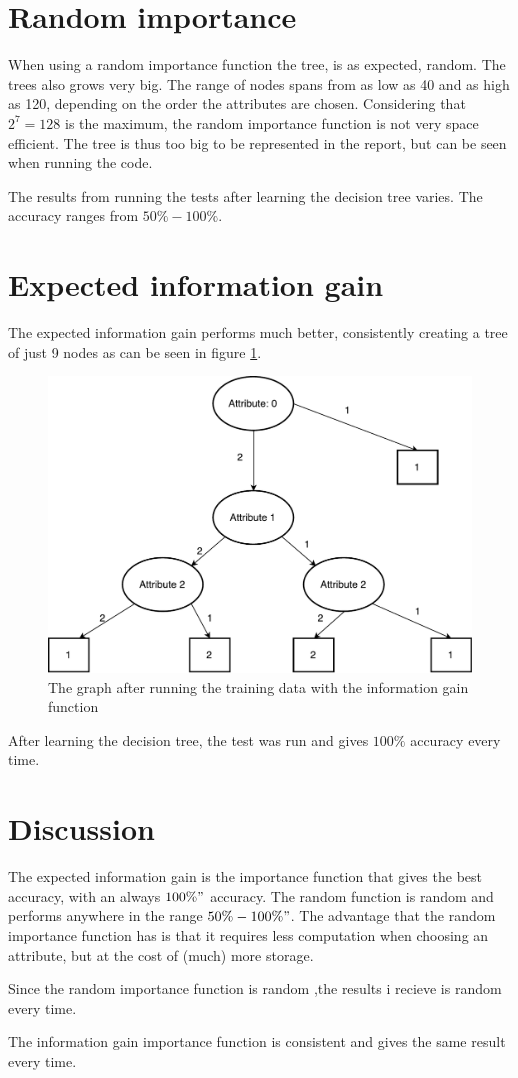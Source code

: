\documentclass[a4paper]{article}
\date{}
\begin{document}
\thispagestyle{fancy}

\section{Random importance}
    When using a random importance function the tree, is as expected, random. The trees also grows very big. The range of nodes spans from as low as 40 and as high as 120, depending on the order the attributes are chosen. Considering that $2^7 = 128$ is the maximum, the random importance function is not very space efficient. The tree is thus too big to be represented in the report, but can be seen when running the code. 

    The results from running the tests after learning the decision tree varies. The accuracy ranges from $50\%-100\%$.

\section{Expected information gain}
    The expected information gain performs much better, consistently creating a tree of just 9 nodes as can be seen in figure \ref{fig:expected}.

    \begin{figure}[ht]
        \centering
        \includegraphics[width=0.8\linewidth]{information_gain.pdf}
        \caption{The graph after running the training data with the information gain function}
        \label{fig:expected}
    \end{figure}

    After learning the decision tree, the test was run and gives $100\%$ accuracy every time.

\section{Discussion}

    The expected information gain is the importance function that gives the best accuracy, with an always $100\%"$ accuracy. The random function is random and performs anywhere in the range $50\%-100\%"$. The advantage that the random importance function has is that it requires less computation when choosing an attribute, but at the cost of (much) more storage.

    Since the random importance function is random ,the results i recieve is random every time.

    The information gain importance function is consistent and gives the same result every time.
\end{document}
